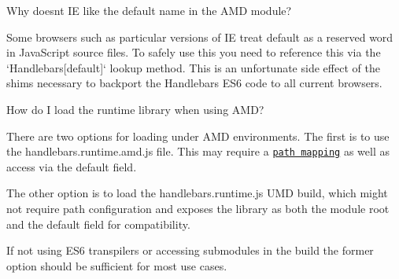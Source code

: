 \begin{DoxyEnumerate}
\item Why doesn\textquotesingle{}t I\+E like the {\ttfamily default} name in the A\+M\+D module?

Some browsers such as particular versions of I\+E treat {\ttfamily default} as a reserved word in Java\+Script source files. To safely use this you need to reference this via the `\+Handlebars\mbox{[}\textquotesingle{}default\textquotesingle{}\mbox{]}` lookup method. This is an unfortunate side effect of the shims necessary to backport the Handlebars E\+S6 code to all current browsers.
\end{DoxyEnumerate}
\begin{DoxyEnumerate}
\item How do I load the runtime library when using A\+M\+D?

There are two options for loading under A\+M\+D environments. The first is to use the {\ttfamily handlebars.\+runtime.\+amd.\+js} file. This may require a \href{https://github.com/wycats/handlebars.js/blob/master/spec/amd-runtime.html#L31}{\tt path mapping} as well as access via the {\ttfamily default} field.

The other option is to load the {\ttfamily handlebars.\+runtime.\+js} U\+M\+D build, which might not require path configuration and exposes the library as both the module root and the {\ttfamily default} field for compatibility.

If not using E\+S6 transpilers or accessing submodules in the build the former option should be sufficient for most use cases. 
\end{DoxyEnumerate}